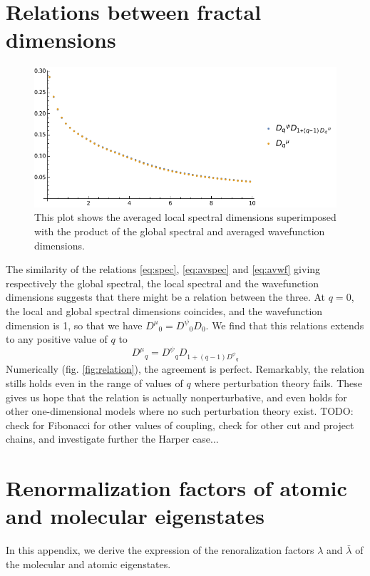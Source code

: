\documentclass[aps,prl,preprint]{revtex4-1}
\newcommand{\avwf}{\ensuremath{D^\psi}}
\newcommand{\avspec}{\ensuremath{D^\mu}}
\begin{document}
\section{Relations between fractal dimensions}

\begin{figure}[htp]
	\centering
	\includegraphics[width=.5\textwidth]{img/spectrum_wf_relation.pdf}
	\caption{This plot shows the averaged local spectral dimensions superimposed with the product of the global spectral and averaged wavefunction dimensions.}
	\label{fig:relation}
\end{figure}

The similarity of the relations \eqref{eq:spec}, \eqref{eq:avspec} and \eqref{eq:avwf} giving respectively the global spectral, the local spectral and the wavefunction dimensions suggests that there might be a relation between the three. At $q=0$, the local and global spectral dimensions coincides, and the wavefunction dimension is 1, so that we have $\avspec_0 = \avwf_0 D_0$. We find that this relations extends to any positive value of $q$ to
\begin{equation}
	\label{eq:relation}
	\avspec_q = \avwf_q D_{1+(q-1)\avwf_q}
\end{equation}
Numerically (fig. \eqref{fig:relation}), the agreement is perfect. 
Remarkably, the relation stills holds even in the range of values of $q$ where perturbation theory fails. These gives us hope that the relation is actually nonperturbative, and even holds for other one-dimensional models where no such perturbation theory exist.
{\color{red} TODO: check for Fibonacci for other values of coupling, check for other cut and project chains, and investigate further the Harper case...}

\newpage
\appendix

\section{Renormalization factors of atomic and molecular eigenstates}
\label{app:renorm}

In this appendix, we derive the expression of the renoralization factors $\lambda$ and $\bar \lambda$ of the molecular and atomic eigenstates.
\end{document}
